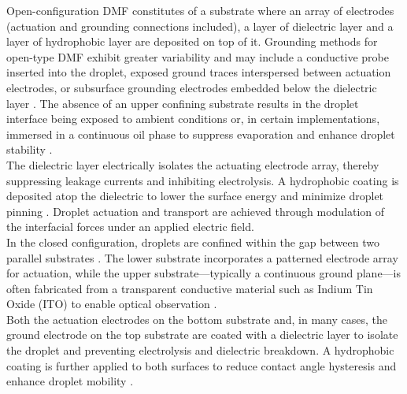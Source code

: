 Open-configuration DMF constitutes of a substrate where an array of electrodes (actuation and grounding connections included), a layer of dielectric layer and a layer of hydrophobic layer are deposited on top of it. Grounding methods for open-type DMF exhibit greater variability and may include a conductive probe inserted into the droplet, exposed ground traces interspersed between actuation electrodes, or subsurface grounding electrodes embedded below the dielectric layer \cite{yafiaDigitalMicrofluidicSystems2018}. The absence of an upper confining substrate results in the droplet interface being exposed to ambient conditions or, in certain implementations, immersed in a continuous oil phase to suppress evaporation and enhance droplet stability \cite{vafaieNumericalSimulationEWOD2019,yafiaHighPrecisionControl2013,yafiaLowCostGrapheneBasedDigital2020}. \\

The dielectric layer electrically isolates the actuating electrode array, thereby suppressing leakage currents and inhibiting electrolysis. A hydrophobic coating is deposited atop the dielectric to lower the surface energy and minimize droplet pinning \cite{abdelgawadDigitalRevolutionNew2009,agarwalDigitalMicrofluidicsTechniques2012,barmanElectrowettingondielectricEWODCurrent2020,jebrailLetsGetDigital2010}. Droplet actuation and transport are achieved through modulation of the interfacial forces under an applied electric field.\\

In the closed configuration, droplets are confined within the gap between two parallel substrates \cite{abdelgawadOptimizationDeviceGeometry2009,al-lababidiMinimumMovableDroplet2023}. The lower substrate incorporates a patterned electrode array for actuation, while the upper substrate—typically a continuous ground plane—is often fabricated from a transparent conductive material such as Indium Tin Oxide (ITO) to enable optical observation \cite{barmanElectrowettingondielectricEWODCurrent2020,sukthangRapidFabricationCloseTyped2020}. \\

Both the actuation electrodes on the bottom substrate and, in many cases, the ground electrode on the top substrate are coated with a dielectric layer to isolate the droplet and preventing electrolysis and dielectric breakdown. A hydrophobic coating is further applied to both surfaces to reduce contact angle hysteresis and enhance droplet mobility \cite{agarwalDigitalMicrofluidicsTechniques2012,jebrailDigitalMicrofluidicsVersatile2012,meimandiDevelopmentElectrowettingDigital2019}.\newpage

